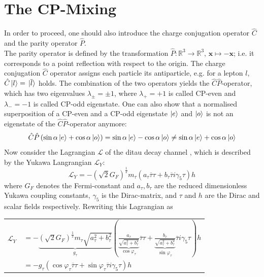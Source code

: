 \section{The CP-Mixing}
In order to proceed, one should also introduce the charge conjugation operator $\hat{C}$ and the parity operator $\hat{P}$. \\
The parity operator is defined by the transformation $\hat{P}: \mathbb{R}^3 \rightarrow \mathbb{R}^3, \, \boldsymbol{x} \mapsto -\boldsymbol{x}$; i.e. it corresponds to a point reflection with respect to the origin. The charge conjugation $\hat{C}$ operator assigns each particle its antiparticle, e.g. for a lepton $l$, $\hat{C}\ket{l} = \ket*{\overline{l}}$ holds. The combination of the two operators yields the $\hat{C}\hat{P}$-operator, which has two eigenvalues $\lambda_\pm=\pm 1$, where $\lambda_+=+1$ is called CP-even and $\lambda_-=-1$ is called CP-odd eigenstate. One can also show that a normalised superposition of a CP-even and a CP-odd eigenstate $\ket{e}$ and $\ket{o}$ is not an eigenstate of the $\hat{C}\hat{P}$-operator anymore:
\begin{equation}
	\hat{C}\hat{P} \left(\sin\alpha\ket{e}+\cos\alpha\ket{o}\right) = \sin\alpha\ket{e}-\cos\alpha\ket{o} \neq \sin\alpha\ket{e}+\cos\alpha\ket{o}
\end{equation}
Now consider the Lagrangian $\mathcal{L}$ of the ditau decay channel \parencite{Berge_DY_bckg}, which is described by the Yukawa Langrangian $\mathcal{L}_Y$:
\begin{equation}
	\mathcal{L}_Y = -\left(\sqrt{2} G_F\right)^\frac{1}{2} m_\tau (a_\tau \overline{\tau}\tau+b_\tau \overline{\tau}i\gamma_5\tau)h
\end{equation}
where $G_F$ denotes the Fermi-constant and $a_\tau, b_\tau$ are the reduced dimensionless Yukawa coupling constants, $\gamma_5$ is the Dirac-matrix, and $\tau$ and $h$ are the Dirac and scalar fields respectively. Rewriting this Lagrangian as
\begin{center}
	\begin{tabular}{ll}
		$\mathcal{L}_Y $ & $= -\underbrace{\left(\sqrt{2} G_F\right)^\frac{1}{2} m_\tau\sqrt{a_\tau^2+b_\tau^2}}_\text{$g_\tau$} \left(\underbrace{\frac{a_\tau}{\sqrt{a_\tau^2+b_\tau^2}}}_\text{$\cos\varphi_\tau$} \overline{\tau}\tau+\underbrace{\frac{b_\tau}{\sqrt{a_\tau^2+b_\tau^2}}}_\text{$\sin\varphi_\tau$} \overline{\tau}i\gamma_5\tau\right)h$\\
		 & $= - g_\tau \left(\cos\varphi_\tau\overline{\tau}\tau+\sin\varphi_\tau\overline{\tau}i\gamma_5\tau\right)h$
	\end{tabular}
\end{center}
